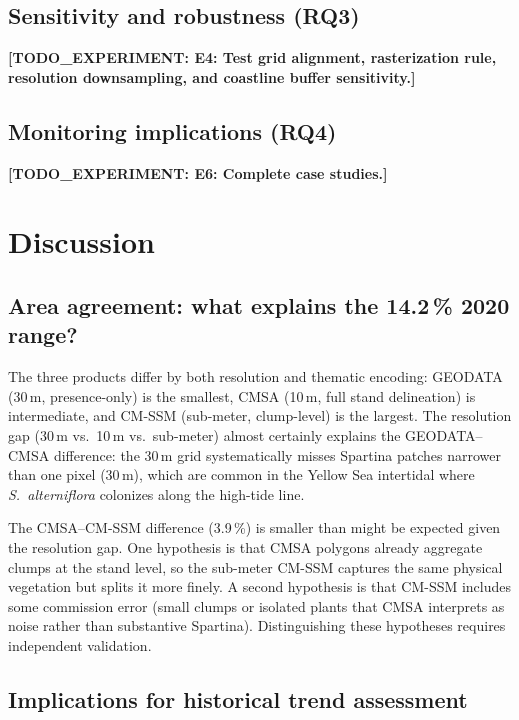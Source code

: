 \documentclass[11pt]{article}
\newcommand{\TODOEXP}[1]{\textcolor{todocolor}{\textbf{[TODO_EXPERIMENT: #1]}}}
\begin{document}
\subsection{Sensitivity and robustness (RQ3)}

\TODOEXP{E4: Test grid alignment, rasterization rule, resolution downsampling,
and coastline buffer sensitivity.}

\subsection{Monitoring implications (RQ4)}

\TODOEXP{E6: Complete case studies.}

\section{Discussion}
\label{sec:discussion}

\subsection{Area agreement: what explains the 14.2\,\% 2020 range?}

The three products differ by both resolution and thematic encoding: GEODATA
(30\,m, presence-only) is the smallest, CMSA (10\,m, full stand delineation) is
intermediate, and CM-SSM (sub-meter, clump-level) is the largest. The resolution
gap (30\,m vs.\ 10\,m vs.\ sub-meter) almost certainly explains the GEODATA--CMSA
difference: the 30\,m grid systematically misses Spartina patches narrower than
one pixel (30\,m), which are common in the Yellow Sea intertidal where
\textit{S.~alterniflora} colonizes along the high-tide line.

The CMSA--CM-SSM difference (3.9\,\%) is smaller than might be expected given
the resolution gap. One hypothesis is that CMSA polygons already aggregate
clumps at the stand level, so the sub-meter CM-SSM captures the same physical
vegetation but splits it more finely. A second hypothesis is that CM-SSM
includes some commission error (small clumps or isolated plants that CMSA
interprets as noise rather than substantive Spartina). Distinguishing these
hypotheses requires independent validation.

\subsection{Implications for historical trend assessment}
\end{document}
